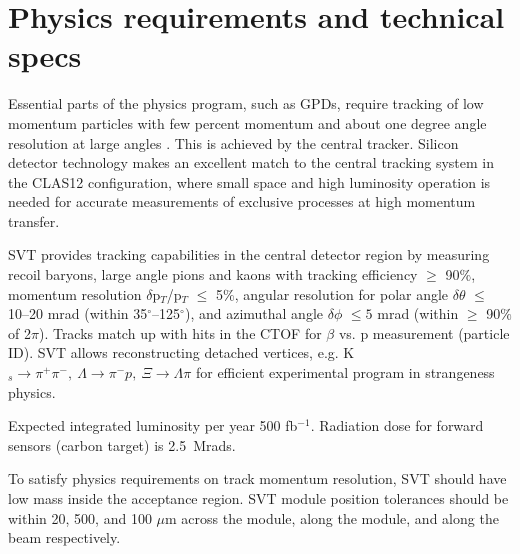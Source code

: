 \section{Physics requirements and technical specs}
Essential parts of the physics program, such as GPDs, require tracking of low momentum  particles with few percent momentum and about one degree angle resolution at large angles \cite{TDR12}. This is achieved by the central tracker.  
Silicon detector technology makes an excellent match to the central tracking system in the CLAS12 configuration, where small space and high luminosity operation is needed for accurate measurements of exclusive processes at high momentum transfer.

SVT provides tracking capabilities in the central detector region by measuring recoil baryons, large angle pions and kaons with tracking efficiency $\ge$ 90$\%$, momentum resolution $\delta$p$_{T}$/p$_{T}$ $\le$ 5$\%$, angular resolution for polar angle $\delta$$\theta$ $\le$ 10--20 mrad (within 35$^\circ$--125$^\circ$), and azimuthal angle $\delta$$\phi$ $\le5$ mrad (within $\ge$ 90$\%$ of 2$\pi$). Tracks match up with hits in the CTOF for $\beta$ vs. p measurement (particle ID). SVT allows reconstructing detached vertices, e.g. K$_{s}\!\to\!\pi^{+}\pi^{-},~\Lambda\!\to\!\pi^{-}p,~\Xi\!\to\!\Lambda\pi$ for efficient experimental program in strangeness physics.  

Expected integrated luminosity per year 500 fb$^{-1}$. Radiation dose for forward sensors (carbon target) is 2.5~Mrads.

To satisfy physics requirements on track momentum resolution, SVT should have low mass inside the acceptance region. SVT module position tolerances should be within 20, 500, and 100 $\mu$m across the module, along the module, and along the beam respectively.
